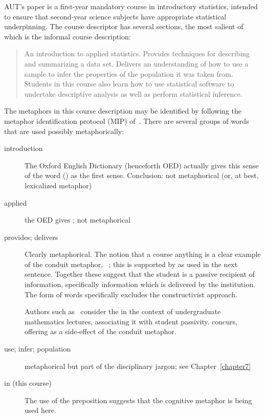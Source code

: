 AUT's  paper is a first-year mandatory course in
introductory statistics, intended to ensure that second-year science
subjects have appropriate statistical underpinning.  The course
descriptor has several sections, the most salient of which is the
informal course description: 

\begin{singlespace}
\begin{quote}
  An introduction to applied statistics.  Provides techniques for
  describing and summarizing a data set.  Delivers an understanding of
  how to use a sample to infer the properties of the population it was
  taken from.  Students in this course also learn how to use
  statistical software to undertake descriptive analysis as well as
  perform statistical inference.
\end{quote}
\end{singlespace}

The metaphors in this course description may be identified by
following the metaphor identification protocol (MIP)
of~.  There are several groups of words that
are used possibly metaphorically:

\begin{description}
\item[introduction] The Oxford English Dictionary (henceforth OED)
  actually gives this sense of the word () as the first sense.  Conclusion: not metaphorical (or,
  at best, lexicalized metaphor)
\item[applied] the OED gives ; not
  metaphorical
\item[provides; delivers] Clearly metaphorical.  The notion that a
  course  anything is a clear example of the
  conduit metaphor, ~\citep{reddy1993}; this is supported by
   as used in the next sentence.  Together these
  suggest that the student is a passive recipient of information,
  specifically information which is delivered by the institution.  The
  form of words specifically excludes the constructivist approach.

  Authors such as~ consider the  in the context of undergraduate mathematics lectures,
  associating it with student passivity.  
  concurs, offering  as a side-effect of the conduit metaphor.
\item[use; infer; population] metaphorical but part of the
  disciplinary jargon; see Chapter~\ref{chapter7}
\item[in (this course)] The use of the preposition 
  suggests that the cognitive metaphor 
  is being used here.
\end{description}

